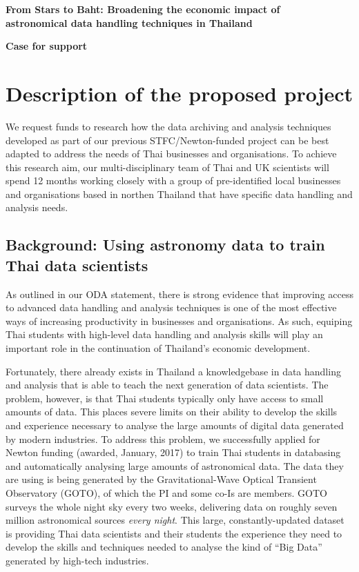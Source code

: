 \documentclass[11pt]{article}
\begin{document}
\setcounter{figure}{0}
\noindent
{\LARGE \bf From Stars to Baht: Broadening the economic impact of \\
astronomical data handling techniques in Thailand}

\vspace{3mm}

\noindent
{\LARGE \bf Case for support}
\section{Description of the proposed project}
\noindent
We request funds to research how the data archiving and analysis techniques developed as part of our previous STFC/Newton-funded project can be best adapted to address the needs of Thai businesses and organisations. To achieve this research aim, our multi-disciplinary team of Thai and UK scientists will spend 12 months working closely with a group of pre-identified local businesses and organisations based in northen Thailand that have specific data handling and analysis needs.

\subsection{Background: Using astronomy data to train Thai data scientists}
As outlined in our ODA statement, there is strong evidence that improving access to advanced data handling and analysis techniques is one of the most effective ways of increasing productivity in businesses and organisations. As such, equiping Thai students with high-level data handling and analysis skills will play an important role in the continuation of Thailand's economic development.

\vspace{2mm}
\noindent
Fortunately, there already exists in Thailand a knowledgebase in data handling and analysis that is able to teach the next generation of data scientists. The problem, however, is that Thai students typically only have access to small amounts of data. This places severe limits on their ability to develop the skills and experience necessary to analyse the large amounts of digital data generated by modern industries. To address this problem, we successfully applied for Newton funding (awarded, January, 2017) to train Thai students in databasing and automatically analysing large amounts of astronomical data. The data they are using is being generated by the Gravitational-Wave Optical Transient Observatory (GOTO), of which the PI and some co-Is are members. GOTO surveys the whole night sky every two weeks, delivering data on roughly seven million astronomical sources {\it every night}. This large, constantly-updated dataset is providing Thai data scientists and their students the experience they need to develop the skills and techniques needed to analyse the kind of ``Big Data'' generated by high-tech industries.
\end{document}
